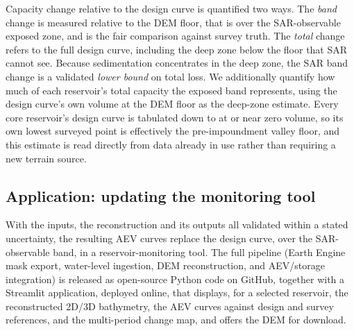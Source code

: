Capacity change relative to the design curve is quantified two ways. The \emph{band}
change is measured relative to the DEM floor, that is over the SAR-observable exposed
zone, and is the fair comparison against survey truth. The \emph{total} change refers to
the full design curve, including the deep zone below the floor that SAR cannot see.
Because sedimentation concentrates in the deep zone, the SAR band change is a validated
\emph{lower bound} on total loss. We additionally quantify how much of each reservoir's
total capacity the exposed band represents, using the design curve's own volume at the
DEM floor as the deep-zone estimate. Every core reservoir's design curve is tabulated
down to at or near zero volume, so its own lowest surveyed point is effectively the
pre-impoundment valley floor, and this estimate is read directly from data already in
use rather than requiring a new terrain source.
\label{sec:capmetrics}

\subsection{Application: updating the monitoring tool}
\label{sec:tool}
With the inputs, the reconstruction and its outputs all validated within a stated
uncertainty, the resulting AEV curves replace the design curve, over the
SAR-observable band, in a reservoir-monitoring tool. The full pipeline (Earth Engine
mask export, water-level ingestion, DEM reconstruction, and AEV/storage integration)
is released as open-source Python code on GitHub, together with a Streamlit
application, deployed online, that displays, for a selected reservoir, the
reconstructed 2D/3D bathymetry, the AEV curves against design and survey references,
and the multi-period change map, and offers the DEM for download.
